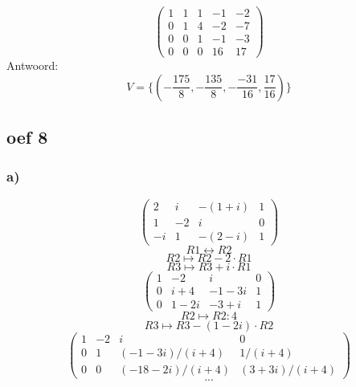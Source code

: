 \documentclass[lineaire_algebra_oplossingen.tex]{subfiles}
\begin{document}
\[
\begin{pmatrix}
1 & 1 & 1 & -1 & -2\\
0 & 1 & 4 & -2 & -7\\
0 & 0 & 1 & -1 & -3\\
0 & 0 & 0 & 16 & 17
\end{pmatrix}
\]
Antwoord:
\[
V = \{(-\frac{175}{8},-\frac{135}{8}, -\frac{-31}{16}, \frac{17}{16})\}
\]
\subsection{oef 8}
\subsubsection*{a)}
\[
\begin{pmatrix}
2 &  i &  -(1+i) & 1 \\
1 &  -2 &  i & 0 \\
-i &  1 &  -(2-i) & 1
\end{pmatrix}
\]
\[ R1 \leftrightarrow R2\]
\[ R2 \longmapsto R2 -2\cdot R1\]
\[ R3 \longmapsto R3 +i\cdot R1\]
\[
\begin{pmatrix}
1 &  -2 &  i & 0 \\
0 &  i+4 &  -1-3i & 1 \\
0 &  1-2i &  -3+i & 1
\end{pmatrix}
\]
\[ R2 \longmapsto R2 : 4\]
\[ R3 \longmapsto R3 -(1-2i)\cdot R2\]
\[
\begin{pmatrix}
1 &  -2 &  i & 0 \\
0 &  1 &  (-1-3i)/(i+4) & 1/(i+4) \\
0 &  0 &  (-18-2i)/(i+4) & (3+3i)/(i+4)
\end{pmatrix}
\]
\[...\]
\end{document}
